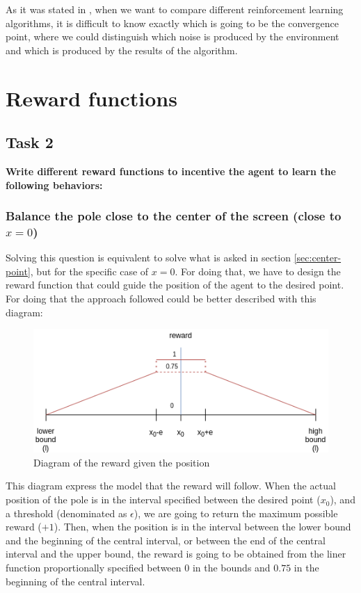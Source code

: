\documentclass[12pt]{article}
\begin{document}
As it was stated in \cite{nagendra2017comparison}, when we want to compare different reinforcement learning algorithms, it is difficult to know exactly which is going to be the convergence point, where we could distinguish which noise is produced by the environment and which is produced by the results of the algorithm.


\section{Reward functions}
\label{sec:reward-functions}

\subsection{Task 2}
\label{sec:reward-task-2}
\textbf {
    Write different reward functions to incentive the agent to learn the following behaviors:
}\\

\subsubsection{Balance the pole close to the center of the screen (close to $x = 0$)}
\label{sec:center}

Solving this question is equivalent to solve what is asked in section \ref{sec:center-point}, but for the specific case of $x=0$. For doing that, we have to design the reward function that could guide the position of the agent to the desired point. For doing that the approach followed could be better described with this diagram:

\begin{figure}[h]
    \centering
    \includegraphics[scale=0.6]{exercise-1/report/img/diagrams/reward-diagram.png}
    \caption{Diagram of the reward given the position}
    \label{fig:reward}
\end{figure}

This diagram express the model that the reward will follow. When the actual position of the pole is in the interval specified between the desired point ($x_0$), and a threshold (denominated as $\epsilon$), we are going to return the maximum possible reward ($+1$). Then, when the position is in the interval between the lower bound and the beginning of the central interval, or between the end of the central interval and the upper bound, the reward is going to be obtained from the liner function proportionally specified between $0$ in the bounds and $0.75$ in the beginning of the central interval. \\
\end{document}

